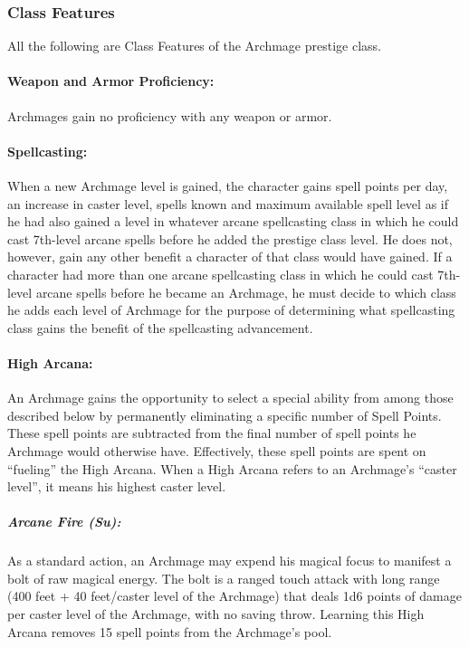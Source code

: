 \subsubsection{Class Features}
All the following are Class Features of the Archmage prestige class.

\paragraph{Weapon and Armor Proficiency:} Archmages gain no proficiency with any weapon or armor.

\paragraph{Spellcasting:} When a new Archmage level is gained, the character gains spell points per day, an increase in caster level, spells known and maximum available spell level as if he had also gained a level in whatever arcane spellcasting class in which he could cast 7th-level arcane spells before he added the prestige class level. 
He does not, however, gain any other benefit a character of that class would have gained. 
If a character had more than one arcane spellcasting class in which he could cast 7th-level arcane spells before he became an Archmage, he must decide to which class he adds each level of Archmage for the purpose of determining what spellcasting class gains the benefit of the spellcasting advancement.

\paragraph{High Arcana:}
An Archmage gains the opportunity to select a special ability from among those described below by permanently eliminating a specific number of Spell Points.
These spell points are subtracted from the final number of spell points he Archmage would otherwise have.
Effectively, these spell points are spent on ``fueling'' the High Arcana.
When a High Arcana refers to an Archmage's ``caster level'', it means his highest caster level.

\subparagraph{Arcane Fire (Su):}
As a standard action, an Archmage may expend his magical focus to manifest a bolt of raw magical energy. 
The bolt is a ranged touch attack with long range (400 feet + 40 feet/caster level of the Archmage) 
that deals 1d6 points of damage per caster level of the Archmage, with no saving throw. 
Learning this High Arcana removes 15 spell points from the Archmage's pool.

